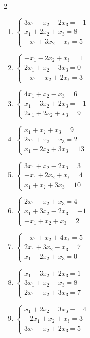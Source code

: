 \begin{multicols}{2}
\begin{enumerate}[label=\arabic*., leftmargin=*]
\item $\begin{cases}3x_1-x_2-2x_3=-1\\x_1+2x_2+x_3=8\\-x_1+3x_2-x_3=5\end{cases}$

\item $\begin{cases}-x_1-2x_2+x_3=1\\2x_1+x_2-3x_3=0\\-x_1-x_2+2x_3=3\end{cases}$

\item $\begin{cases}4x_1+x_2-x_3=6\\x_1-3x_2+2x_3=-1\\2x_1+2x_2+x_3=9\end{cases}$

\item $\begin{cases}x_1+x_2+x_3=9\\2x_1+x_2-x_3=2\\x_1-2x_2+3x_3=13\end{cases}$

\item $\begin{cases}3x_1+x_2-2x_3=3\\-x_1+2x_2+x_3=4\\x_1+x_2+3x_3=10\end{cases}$

\item $\begin{cases}2x_1-x_2+x_3=4\\x_1+3x_2-2x_3=-1\\-x_1+x_2+x_3=2\end{cases}$

\item $\begin{cases}-x_1+x_2+4x_3=5\\2x_1+3x_2-x_3=7\\x_1-2x_2+x_3=0\end{cases}$

\item $\begin{cases}x_1-3x_2+2x_3=1\\3x_1+x_2-x_3=8\\2x_1-x_2+3x_3=7\end{cases}$

\item $\begin{cases}x_1+2x_2-3x_3=-4\\-2x_1+x_2+x_3=3\\3x_1-x_2+2x_3=5\end{cases}$


\end{enumerate}
\end{multicols}
